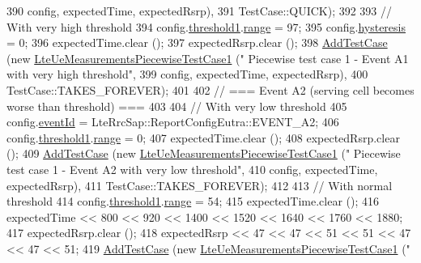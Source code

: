 \begin{DoxyCode}
390                                                         config, expectedTime, expectedRsrp),
391                TestCase::QUICK);
392 
393   \textcolor{comment}{// With very high threshold}
394   config.\hyperlink{structns3_1_1LteRrcSap_1_1ReportConfigEutra_a8f36bc45a61054920e490be8bf33b4ca}{threshold1}.\hyperlink{structns3_1_1LteRrcSap_1_1ThresholdEutra_abd4950e20a1a93727535e8364bf85b03}{range} = 97;
395   config.\hyperlink{structns3_1_1LteRrcSap_1_1ReportConfigEutra_a1fb9169ea261ba20af6a0c18fcc04fa9}{hysteresis} = 0;
396   expectedTime.clear ();
397   expectedRsrp.clear ();
398   \hyperlink{classns3_1_1TestCase_a3718088e3eefd5d6454569d2e0ddd835}{AddTestCase} (\textcolor{keyword}{new} \hyperlink{classLteUeMeasurementsPiecewiseTestCase1}{LteUeMeasurementsPiecewiseTestCase1} (\textcolor{stringliteral}{"
      Piecewise test case 1 - Event A1 with very high threshold"},
399                                                         config, expectedTime, expectedRsrp),
400                TestCase::TAKES\_FOREVER);
401 
402   \textcolor{comment}{// === Event A2 (serving cell becomes worse than threshold) ===}
403 
404   \textcolor{comment}{// With very low threshold}
405   config.\hyperlink{structns3_1_1LteRrcSap_1_1ReportConfigEutra_a1fbe931cc9584614d20f4affbce70d8a}{eventId} = LteRrcSap::ReportConfigEutra::EVENT\_A2;
406   config.\hyperlink{structns3_1_1LteRrcSap_1_1ReportConfigEutra_a8f36bc45a61054920e490be8bf33b4ca}{threshold1}.\hyperlink{structns3_1_1LteRrcSap_1_1ThresholdEutra_abd4950e20a1a93727535e8364bf85b03}{range} = 0;
407   expectedTime.clear ();
408   expectedRsrp.clear ();
409   \hyperlink{classns3_1_1TestCase_a3718088e3eefd5d6454569d2e0ddd835}{AddTestCase} (\textcolor{keyword}{new} \hyperlink{classLteUeMeasurementsPiecewiseTestCase1}{LteUeMeasurementsPiecewiseTestCase1} (\textcolor{stringliteral}{"
      Piecewise test case 1 - Event A2 with very low threshold"},
410                                                         config, expectedTime, expectedRsrp),
411                TestCase::TAKES\_FOREVER);
412 
413   \textcolor{comment}{// With normal threshold}
414   config.\hyperlink{structns3_1_1LteRrcSap_1_1ReportConfigEutra_a8f36bc45a61054920e490be8bf33b4ca}{threshold1}.\hyperlink{structns3_1_1LteRrcSap_1_1ThresholdEutra_abd4950e20a1a93727535e8364bf85b03}{range} = 54;
415   expectedTime.clear ();
416   expectedTime << 800 << 920 << 1400 << 1520 << 1640 << 1760 << 1880;
417   expectedRsrp.clear ();
418   expectedRsrp << 47 << 47 << 51 << 51 << 47 << 47 << 51;
419   \hyperlink{classns3_1_1TestCase_a3718088e3eefd5d6454569d2e0ddd835}{AddTestCase} (\textcolor{keyword}{new} \hyperlink{classLteUeMeasurementsPiecewiseTestCase1}{LteUeMeasurementsPiecewiseTestCase1} (\textcolor{stringliteral}{"
}
\end{DoxyCode}

